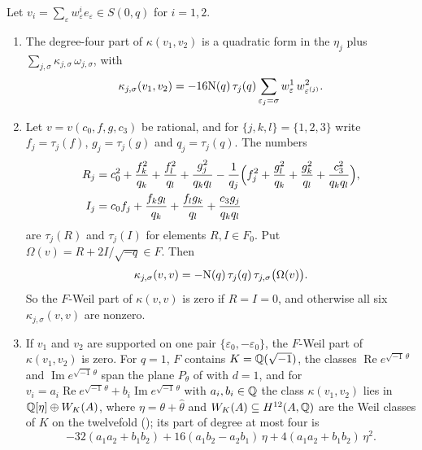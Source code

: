\begin{lemma}\label{lem:sexticweil}
Let $v_{i}=\sum_{\varepsilon}w^{i}_{\varepsilon}e_{\varepsilon}\in S(0,q)$ for
$i=1,2$.
\begin{enumerate}[label=\textup{(\roman*)},leftmargin=2.6em,itemsep=2pt]
\item The degree-four part of $\kappa(v_{1},v_{2})$ is a quadratic form in the
  $\eta_{j}$ plus $\sum_{j,\sigma}\kappa_{j,\sigma}\,\omega_{j,\sigma}$, with
  \[
    \kappa_{j,\sigma}(v_{1},v_{2})=-16\mathrm{N}(q)\,\tau_{j}(q)
    \sum_{\varepsilon_{j}=\sigma}w^{1}_{\varepsilon}\,w^{2}_{\varepsilon^{(j)}}.
  \]
\item Let $v=v(c_{0},f,g,c_{3})$ be rational, and for $\{j,k,l\}=\{1,2,3\}$
  write $f_{j}=\tau_{j}(f)$, $g_{j}=\tau_{j}(g)$ and $q_{j}=\tau_{j}(q)$. The
  numbers
  \begin{align*}
    R_{j}&=c_{0}^{2}+\frac{f_{k}^{2}}{q_{k}}+\frac{f_{l}^{2}}{q_{l}}
      +\frac{g_{j}^{2}}{q_{k}q_{l}}-\frac{1}{q_{j}}\Bigl(f_{j}^{2}
      +\frac{g_{l}^{2}}{q_{k}}+\frac{g_{k}^{2}}{q_{l}}
      +\frac{c_{3}^{2}}{q_{k}q_{l}}\Bigr),\\
    I_{j}&=c_{0}f_{j}+\frac{f_{k}g_{l}}{q_{k}}+\frac{f_{l}g_{k}}{q_{l}}
      +\frac{c_{3}g_{j}}{q_{k}q_{l}}
  \end{align*}
  are $\tau_{j}(R)$ and $\tau_{j}(I)$ for elements $R,I\in F_{0}$. Put
  $\Omega(v)=R+2I/\sqrt{-q}\in F$. Then
  \[
    \kappa_{j,\sigma}(v,v)=-\mathrm{N}(q)\,\tau_{j}(q)\,\tau_{j,\sigma}\bigl(\Omega(v)\bigr).
  \]
  So the $F$-Weil part of $\kappa(v,v)$ is zero if $R=I=0$, and otherwise
  all six $\kappa_{j,\sigma}(v,v)$ are nonzero.
\item If $v_{1}$ and $v_{2}$ are supported on one pair
  $\{\varepsilon_{0},-\varepsilon_{0}\}$, the $F$-Weil part of
  $\kappa(v_{1},v_{2})$ is zero. For $q=1$, $F$ contains
  $K=\mathbb{Q}(\sqrt{-1})$, the classes $\operatorname{Re}e^{\sqrt{-1}\,\theta}$ and
  $\operatorname{Im}e^{\sqrt{-1}\,\theta}$ span the plane $P_{\theta}$ of
   with $d=1$, and for
  $v_{i}=a_{i}\operatorname{Re}e^{\sqrt{-1}\,\theta}
  +b_{i}\operatorname{Im}e^{\sqrt{-1}\,\theta}$ with $a_{i},b_{i}\in\mathbb{Q}$ the
  class $\kappa(v_{1},v_{2})$ lies in $\mathbb{Q}[\eta]\oplus W_{K}(A)$, where
  $\eta=\theta+\widehat\theta$ and $W_{K}(A)\subseteq H^{12}(A,\mathbb{Q})$ are the
  Weil classes of $K$ on the twelvefold (); its part of
  degree at most four is
  \[
    -32(a_{1}a_{2}+b_{1}b_{2})+16(a_{1}b_{2}-a_{2}b_{1})\,\eta
    +4(a_{1}a_{2}+b_{1}b_{2})\,\eta^{2}.
  \]
\end{enumerate}
\end{lemma}

